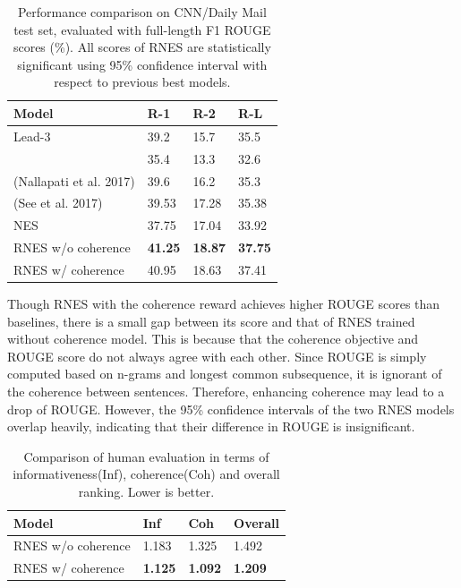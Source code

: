 \documentclass[letterpaper]{article} %
\begin{document}
	\vspace{-5pt}
	\begin{table}[ht]
		\centering
		\caption{Performance comparison on CNN/Daily Mail test set, evaluated with full-length F1 ROUGE scores (\%). All scores of RNES are statistically significant using 95\% confidence interval with respect to previous best models.}
		\label{tab:rouge_cnn_dm}
		\begin{tabular}{|p{32mm}|p{12mm}|p{12mm}|p{11mm}|}
			\hline
			Model&R-1&R-2&R-L\\\hline
			Lead-3&39.2&15.7&35.5\\
			\cite{nallapati_ramesh_abstractive_2016}&35.4&13.3&32.6\\
			(Nallapati et al. 2017) &39.6&16.2&35.3\\
			(See et al. 2017)&39.53&17.28&35.38\\
			NES & 37.75 & 17.04 & 33.92\\\hline
			RNES w/o coherence&\textbf{41.25}&\textbf{18.87}&\textbf{37.75}\\
			RNES w/ coherence&40.95&18.63&37.41\\\hline
		\end{tabular}
	\end{table}
	\vspace{-5pt}

	Though RNES with the coherence reward achieves higher ROUGE scores than baselines, there is a small gap between its score and that of RNES trained without coherence model. This is because that the coherence objective and ROUGE score do not always agree with each other. Since ROUGE is simply computed based on n-grams and longest common subsequence, it is ignorant of the coherence between sentences. Therefore, enhancing coherence may lead to a drop of ROUGE. However, the 95\% confidence intervals of the two RNES models overlap heavily, indicating that their difference in ROUGE is insignificant.
	
	\vspace{-5pt}
	\begin{table}[ht]
	\centering
	\caption{Comparison of human evaluation in terms of informativeness(Inf), coherence(Coh) and overall ranking. Lower is better.}
	\label{tab:human_eval}
	
	\begin{tabular}{|p{31mm}|p{12mm}|p{12mm}|p{12mm}|}
		\hline
		Model&Inf&Coh&Overall\\\hline
		RNES w/o coherence&1.183&1.325&1.492 \\
		RNES w/ coherence& \textbf{1.125} & \textbf{1.092} & \textbf{1.209} \\\hline
	\end{tabular}
	\end{table}	
    \vspace{-5pt}
\end{document}
